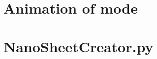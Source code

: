 
\appendix
\appendixpage
\addappheadtotoc
\section{Animation of  mode}
\begin{center}
\end{center}
\section{NanoSheetCreator.py}
\label{NSCstart}
\inputminted[python3=true,bgcolor=Black,linenos=true]{python}{VNL/PythonScripts/NanoSheetCreator.py}
\label{NSCend}
